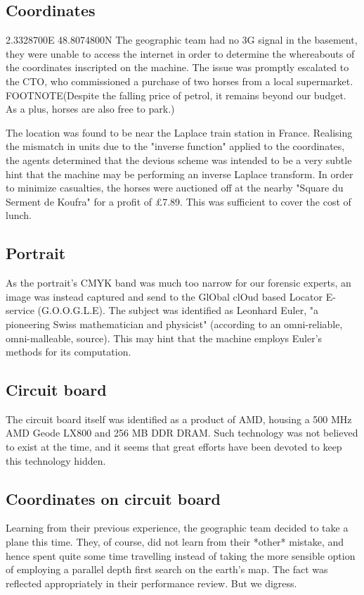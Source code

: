 \documentclass[11pt,twocolumn]{article} %
\begin{document}
\subsection{Coordinates}
2.3328700E 48.8074800N
The geographic team had no 3G signal in the basement, they were unable to access the internet in order to determine the whereabouts of the coordinates inscripted on the machine. The issue was promptly escalated to the CTO, who commissioned a purchase of two horses from a local supermarket. FOOTNOTE(Despite the falling price of petrol, it remains beyond our budget. As a plus, horses are also free to park.)

The location was found to be near the Laplace train station in France. Realising the mismatch in units due to the "inverse function" applied to the coordinates, the agents determined that the devious scheme was intended to be a very subtle hint that the machine may be performing an inverse Laplace transform. In order to minimize casualties, the horses were auctioned off at the nearby "Square du Serment de Koufra" for a profit of £7.89. This was sufficient to cover the cost of lunch.



\subsection{Portrait}
As the portrait's CMYK band was much too narrow for our forensic experts, an image was instead captured and send to the GlObal clOud based Locator E-service (G.O.O.G.L.E). The subject was identified as Leonhard Euler, "a pioneering Swiss mathematician and physicist" (according to an omni-reliable, omni-malleable, source). This may hint that the machine employs Euler's methods for its computation.



\subsection{Circuit board}
The circuit board itself was identified as a product of AMD, housing a 500 MHz AMD Geode LX800 and 256 MB DDR DRAM. Such technology was not believed to exist at the time, and it seems that great efforts have been devoted to keep this technology hidden.


\subsection{Coordinates on circuit board}
Learning from their previous experience, the geographic team decided to take a plane this time. They, of course, did not learn from their *other* mistake, and hence spent quite some time travelling instead of taking the more sensible option of employing a parallel depth first search on the earth's map. The fact was reflected appropriately in their performance review. But we digress.
\end{document}
